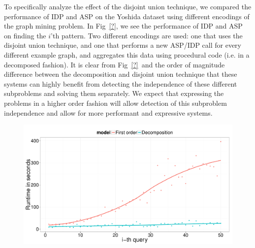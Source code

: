 To specifically analyze the effect of the disjoint union technique, we compared the performance of IDP and ASP on the Yoshida dataset using different encodings of the graph mining problem.
In Fig~\ref{?}, we see the performance of IDP and ASP on finding the $i$'th pattern.
Two different encodings are used: one that uses the disjoint union technique, and one that performs a new ASP/IDP call for every different example graph, and aggregates this data using procedural code (i.e. in a decomposed fashion).
It is clear from Fig~\ref{?}\ and the order of magnitude difference between the decomposition and disjoint union technique that these systems can highly benefit from detecting the independence of these different subproblems and solving them separately.
We expect that expressing the problems in a higher order fashion will allow detection of this subproblem independence and allow for more performant and expressive systems.
\begin{figure}[h]
\includegraphics[scale=0.20]{extra/figure_comparison_yoshida.pdf}

\end{figure}
